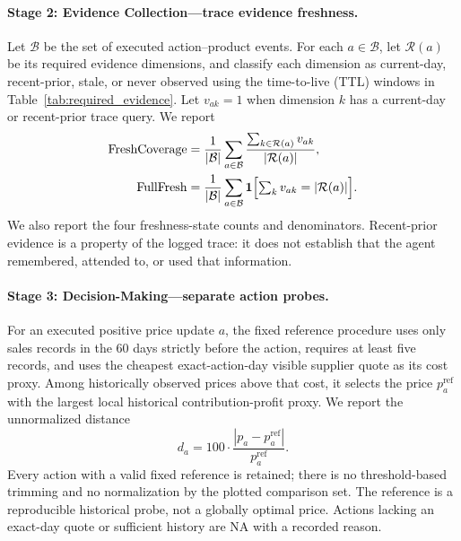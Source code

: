 \paragraph{Stage 2: Evidence Collection---trace evidence freshness.}
Let $\mathcal{B}$ be the set of executed action--product events. For each $a\in\mathcal{B}$, let $\mathcal{R}(a)$ be its required evidence dimensions, and classify each dimension as current-day, recent-prior, stale, or never observed using the time-to-live (TTL) windows in Table~\ref{tab:required_evidence}. Let $v_{ak}=1$ when dimension $k$ has a current-day or recent-prior trace query. We report
\begin{equation}
\begin{aligned}
\mathrm{FreshCoverage}
&=\frac{1}{|\mathcal{B}|}\sum_{a\in\mathcal{B}}
\frac{\sum_{k\in\mathcal{R}(a)}v_{ak}}{|\mathcal{R}(a)|},\\
\mathrm{FullFresh}
&=\frac{1}{|\mathcal{B}|}\sum_{a\in\mathcal{B}}
\mathbf{1}\Bigl[\textstyle\sum_k v_{ak}=|\mathcal{R}(a)|\Bigr].
\end{aligned}
\end{equation}
We also report the four freshness-state counts and denominators. Recent-prior evidence is a property of the logged trace: it does not establish that the agent remembered, attended to, or used that information.

\paragraph{Stage 3: Decision-Making---separate action probes.}
For an executed positive price update $a$, the fixed reference procedure uses only sales records in the 60 days strictly before the action, requires at least five records, and uses the cheapest exact-action-day visible supplier quote as its cost proxy. Among historically observed prices above that cost, it selects the price $p_a^{\mathrm{ref}}$ with the largest local historical contribution-profit proxy. We report the unnormalized distance
\begin{equation}
d_a=100\cdot\frac{|p_a-p_a^{\mathrm{ref}}|}{p_a^{\mathrm{ref}}}.
\end{equation}
Every action with a valid fixed reference is retained; there is no threshold-based trimming and no normalization by the plotted comparison set. The reference is a reproducible historical probe, not a globally optimal price. Actions lacking an exact-day quote or sufficient history are NA with a recorded reason.

